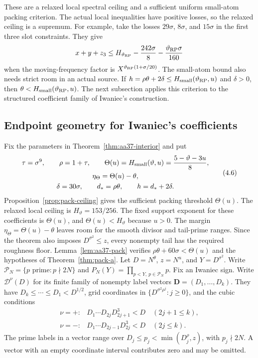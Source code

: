 These are a relaxed local spectral ceiling and a sufficient uniform
small-atom packing criterion. The actual local inequalities have
positive losses, so the relaxed ceiling is a supremum. For example,
take the losses $29\sigma$, $8\sigma$, and $15\sigma$ in the first
three slot constraints. They give
\[
 x+y+z_3\le H_{\vartheta_{\rm RP}}-\frac{242\sigma}{8}
                    -\frac{\vartheta_{\rm RP}\sigma}{160}
\]
when the moving-frequency factor is $X^{\vartheta_{\rm RP}(1+\sigma/20)}$.
The small-atom bound also needs strict room in an actual source.
If $h=\rho \theta+2\delta\le H_{\rm small}(\vartheta_{\rm RP},u)$ and
$\delta>0$, then $\theta<H_{\rm small}(\vartheta_{\rm RP},u)$.
The next subsection applies this criterion to the structured
coefficient family of Iwaniec's construction.

\subsection{Endpoint geometry for Iwaniec's coefficients}

Fix the parameters in Theorem~\ref{thm:aa37-interior} and put
\[
\begin{gathered}
 \tau=\sigma^9,\qquad \rho=1+\tau,\qquad
 \Theta(u)=H_{\rm small}(\vartheta,u)=\frac{5-\vartheta-3u}{8},\\
 \eta_\Theta=\Theta(u)-\theta,\\
 \delta=30\sigma,\qquad d_*=\rho \theta,\qquad h=d_*+2\delta.
\end{gathered}
 \tag{4.6}\label{eq:pack-aa37-parameters}
\]
Proposition~\ref{prop:pack-ceiling} gives the sufficient packing threshold $\Theta(u)$.
The relaxed local ceiling is $H_\vartheta=153/256$. The fixed
support exponent for these coefficients is $\Theta(u)$, and
$\Theta(u)<H_\vartheta$ because $u>0$. The margin
$\eta_\Theta=\Theta(u)-\theta$ leaves room for the smooth divisor and tail-prime
ranges. Since the theorem also imposes $D^{\sigma^2}\le z$, every
nonempty tail has the required roughness floor. Lemma~\ref{lem:aa37-pack} verifies
$\rho \theta+60\sigma<\Theta(u)$ and the hypotheses of
Theorem~\ref{thm:pack-a}.
Let $D=N^{\theta}$, $z=N^u$, and $Y=D^{\sigma^2}$. Write
$\mathcal P_N=\{p\text{ prime}:p\nmid2N\}$ and
$P_N(Y)=\prod_{p<Y,\ p\in\mathcal P_N}p$. Fix an Iwaniec
sign. Write $\mathcal D^\nu(D)$ for its finite family of nonempty
label vectors $\mathbf D=(D_1,\ldots,D_k)$. They have
$D_k\le\cdots\le D_1<D^{1/2}$, grid coordinates in
$\{D^{\sigma^2\rho^j}:j\ge0\}$, and the cubic conditions
\[
\begin{array}{ll}
 \nu=+:&D_1\cdots D_{2j}D_{2j+1}^3<D
                    \quad(2j+1\le k),\\
 \nu=-:&D_1\cdots D_{2j-1}D_{2j}^3<D
                    \quad(2j\le k).
\end{array}
 \tag{4.7}\label{eq:pack-aa37-cubic}
\]
The prime labels in a vector range over
$D_j\le p_j<\min(D_j^\rho,z)$, with $p_j\nmid2N$. A vector with
an empty coordinate interval contributes zero and may be omitted.

